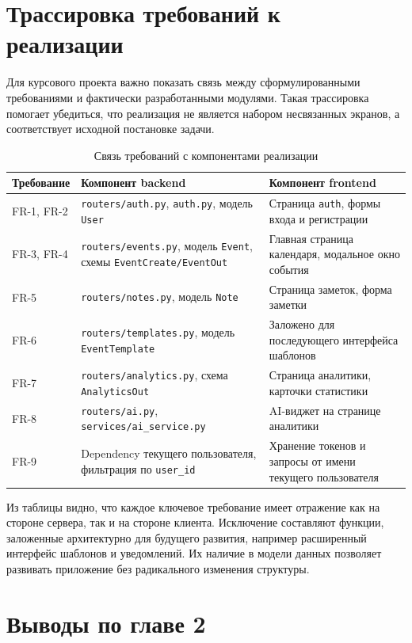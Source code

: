 \documentclass[14pt,a4paper]{extreport}
\begin{document}
\section{Трассировка требований к реализации}

Для курсового проекта важно показать связь между сформулированными требованиями и фактически разработанными модулями. Такая трассировка помогает убедиться, что реализация не является набором несвязанных экранов, а соответствует исходной постановке задачи.

\begin{longtable}{|p{}|p{}|p{}|}
\caption{Связь требований с компонентами реализации}\\
\hline
\textbf{Требование} & \textbf{Компонент backend} & \textbf{Компонент frontend}\\
\hline
FR-1, FR-2 & \texttt{routers/auth.py}, \texttt{auth.py}, модель \texttt{User} & Страница \texttt{auth}, формы входа и регистрации\\
\hline
FR-3, FR-4 & \texttt{routers/events.py}, модель \texttt{Event}, схемы \texttt{EventCreate/EventOut} & Главная страница календаря, модальное окно события\\
\hline
FR-5 & \texttt{routers/notes.py}, модель \texttt{Note} & Страница заметок, форма заметки\\
\hline
FR-6 & \texttt{routers/templates.py}, модель \texttt{EventTemplate} & Заложено для последующего интерфейса шаблонов\\
\hline
FR-7 & \texttt{routers/analytics.py}, схема \texttt{AnalyticsOut} & Страница аналитики, карточки статистики\\
\hline
FR-8 & \texttt{routers/ai.py}, \texttt{services/ai\_service.py} & AI-виджет на странице аналитики\\
\hline
FR-9 & Dependency текущего пользователя, фильтрация по \texttt{user\_id} & Хранение токенов и запросы от имени текущего пользователя\\
\hline
\end{longtable}

Из таблицы видно, что каждое ключевое требование имеет отражение как на стороне сервера, так и на стороне клиента. Исключение составляют функции, заложенные архитектурно для будущего развития, например расширенный интерфейс шаблонов и уведомлений. Их наличие в модели данных позволяет развивать приложение без радикального изменения структуры.

\section{Выводы по главе 2}
\end{document}

